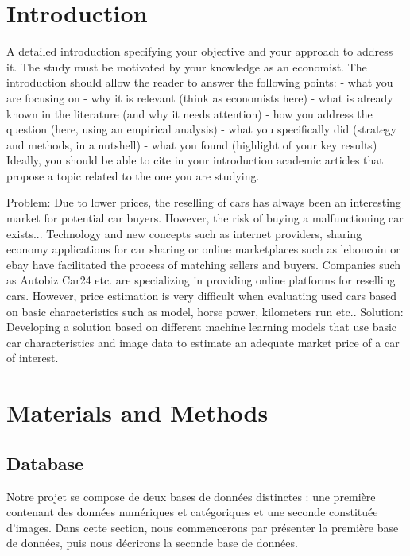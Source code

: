 \documentclass[12pt]{article}
\begin{document}
\renewcommand{\contentsname}{Table of contents}\tableofcontents

\newpage

\section{Introduction}



A detailed introduction specifying your objective and your approach to address it. The study must
be motivated by your knowledge as an economist. The introduction should allow the reader to
answer the following points:
- what you are focusing on
- why it is relevant (think as economists here)
- what is already known in the literature (and why it needs attention)
- how you address the question (here, using an empirical analysis)
- what you specifically did (strategy and methods, in a nutshell)
- what you found (highlight of your key results)
Ideally, you should be able to cite in your introduction academic articles that propose a topic related
to the one you are studying.




Problem: Due to lower prices, the reselling of cars has always been an interesting market for potential car buyers. However, the risk of buying a malfunctioning car exists...
Technology and new concepts such as internet providers, sharing economy applications for car sharing or online marketplaces such as leboncoin or ebay have facilitated the process of matching sellers and buyers. Companies such as Autobiz Car24 etc. are specializing in providing online platforms for reselling cars. However, price estimation is very difficult when evaluating used cars based on basic characteristics such as model, horse power, kilometers run etc..
Solution: Developing a solution based on different machine learning models that use basic car  characteristics and image data to estimate an adequate market price of a car of interest.



\section{Materials and Methods}
\subsection{Database}

Notre projet se compose de deux bases de données distinctes : une première contenant des données numériques et catégoriques et une seconde constituée d'images. Dans cette section, nous commencerons par présenter la première base de données, puis nous décrirons la seconde base de données.
\end{document}
